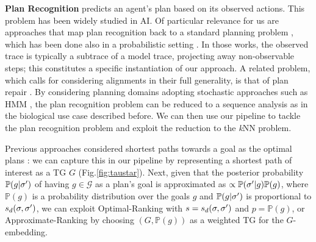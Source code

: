 
\smallskip
\noindent
\textbf{Plan Recognition}
 predicts an agent's plan based on its observed actions. This problem has been widely studied in AI. Of particular relevance for us are approaches that map plan recognition back to a standard planning problem \cite{RamirezG09}, which has been done also in a probabilistic setting \cite{RamirezG10}. In those works, the observed trace is typically a subtrace of a model trace, projecting away non-observable steps; this constitutes a specific instantiation of our approach.
A related problem, which calls for considering alignments in their full generality, is that of plan repair \cite{FoxGLS06}.
By considering planning domains adopting stochastic approaches such as HMM \cite{LI2020101974}, the plan recognition problem can be reduced to a sequence analysis as in the biological use case described before. We can then use our pipeline to tackle the plan recognition problem and exploit the reduction to the \textit{k}NN problem. %

Previous approaches considered shortest paths towards a goal as the optimal plans \cite{RamirezG10}: we can capture this in our pipeline by %
representing a shortest path of interest as a TG $G$ (Fig.\ref{fig:taustar}). Next, given that the posterior probability $\mathbb{P}(g|{\sigma'})$ of having $g\in\mathcal{G}$ as a plan's goal is approximated  as $\propto \mathbb{P}({\sigma'}|g)\mathbb{P}(g)$, where $\mathbb{P}(g)$ is a probability distribution  over the goals $g$ and $\mathbb{P}(g|{\sigma'})$ is  proportional to $s_d(\sigma,{\sigma'})$, we can exploit Optimal-Ranking with $s=s_d(\sigma,{\sigma'})$ and $p=\mathbb{P}(g)$, or Approximate-Ranking by choosing $(G,\mathbb{P}(g))$ as a weighted TG for the $G$-embedding. 